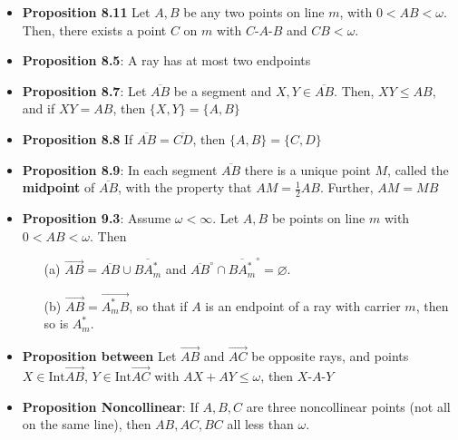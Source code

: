 \documentclass{report}
\begin{document}
\begin{itemize}
        \item \textbf{Proposition 8.11} Let $A,B$ be any two points on line $m$, with $0 < AB <\omega$. Then, there exists a point $C$ on $m$ with $ C\text{-}A\text{-}B$ and $ CB < \omega$.
        \item \textbf{Proposition 8.5}: A ray has at most two endpoints
        \item \textbf{Proposition 8.7}: Let $\overline{AB}$ be a segment and $X,Y \in \overline{AB}$. Then, $XY \leq AB$, and if $XY = AB$, then $\{X,Y\} = \{A,B\}$
        \item \textbf{Proposition 8.8} If $\overline{AB} = \overline{CD}$, then $\{A,B\}  = \{C,D\}$
        \item \textbf{Proposition 8.9}: In each segment $\overline{AB}$ there is a unique point $M$, called the \textbf{midpoint} of $\overline{AB} $, with the property that $AM = \frac{1}{2}AB$. Further, $AM = MB $
        \item \textbf{Proposition 9.3}: Assume \( \omega < \infty \). Let \( A, B \) be points on line \( m \)  
            with \( 0 < AB < \omega \). Then  
            \begin{enumerate}
                \item[(a)] \( \overrightarrow{AB} = \overline{AB} \cup \overline{BA_m^*} \) and \( \overline{AB}^{\circ} \cap \overline{BA_m^*}^{\circ} = \varnothing \).
                \item[(b)] \( \overrightarrow{AB} = \overrightarrow{A_m^* B} \), so that if \( A \) is an endpoint of a ray  
                    with carrier \( m \), then so is \( A_m^* \).
            \end{enumerate}
        \item \textbf{Proposition between} Let $\overrightarrow{AB}$ and $\overrightarrow{AC}$ be opposite rays, and points $X \in \text{Int}\overrightarrow{AB}$, $Y \in \text{Int}\overrightarrow{AC} $ with $AX + AY \leq \omega$, then $ X\text{-}A\text{-}Y$
        \item \textbf{Proposition Noncollinear}: If $A,B,C$ are three noncollinear points (not all on the same line), then $AB, AC,BC$ all less than $\omega$.

    \end{itemize}

    \pagebreak 
    \bigbreak \noindent 
\end{document}
